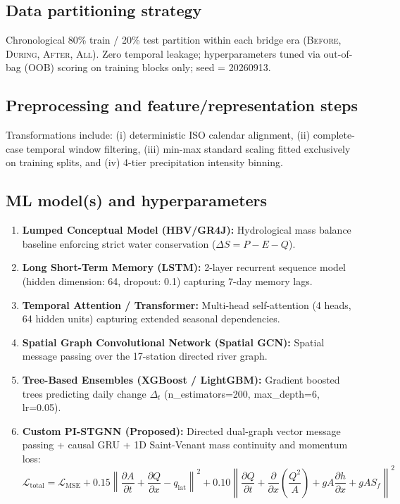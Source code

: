 \documentclass[11pt,a4paper]{article}
\begin{document}
\subsection{Data partitioning strategy}
Chronological 80\% train / 20\% test partition within each bridge era (\textsc{Before}, \textsc{During}, \textsc{After}, \textsc{All}). Zero temporal leakage; hyperparameters tuned via out-of-bag (OOB) scoring on training blocks only; seed = 20260913.

\subsection{Preprocessing and feature/representation steps}
Transformations include: (i) deterministic ISO calendar alignment, (ii) complete-case temporal window filtering, (iii) min-max standard scaling fitted exclusively on training splits, and (iv) 4-tier precipitation intensity binning.

\subsection{ML model(s) and hyperparameters}
\begin{enumerate}[leftmargin=16pt,itemsep=1pt]
  \item \textbf{Lumped Conceptual Model (HBV/GR4J):} Hydrological mass balance baseline enforcing strict water conservation ($\Delta S = P - E - Q$).
  \item \textbf{Long Short-Term Memory (LSTM):} 2-layer recurrent sequence model (hidden dimension: 64, dropout: 0.1) capturing 7-day memory lags.
  \item \textbf{Temporal Attention / Transformer:} Multi-head self-attention (4 heads, 64 hidden units) capturing extended seasonal dependencies.
  \item \textbf{Spatial Graph Convolutional Network (Spatial GCN):} Spatial message passing over the 17-station directed river graph.
  \item \textbf{Tree-Based Ensembles (XGBoost / LightGBM):} Gradient boosted trees predicting daily change $\Delta_t$ (n\_estimators=200, max\_depth=6, lr=0.05).
  \item \textbf{Custom PI-STGNN (Proposed):} Directed dual-graph vector message passing + causal GRU + 1D Saint-Venant mass continuity and momentum loss:
  $$\mathcal{L}_{\text{total}} = \mathcal{L}_{\text{MSE}} + 0.15\left\|\frac{\partial A}{\partial t} + \frac{\partial Q}{\partial x} - q_{\text{lat}}\right\|^2 + 0.10\left\|\frac{\partial Q}{\partial t} + \frac{\partial}{\partial x}\left(\frac{Q^2}{A}\right) + gA\frac{\partial h}{\partial x} + gAS_f\right\|^2$$
\end{enumerate}
\end{document}
